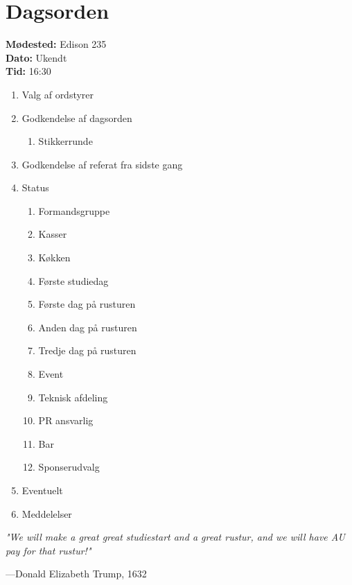 

\newcommand{\meeting}{Stormøde 1}
\newcommand{\dato}{Ukendt}
\newcommand{\tid}{16:30}
\newcommand{\location}{Edison 235}



\section*{Dagsorden}%
\textbf{Mødested:} \location{}\\
\textbf{Dato:} \dato{}\\
\textbf{Tid:} \tid{}

\begin{enumerate}
  \item Valg af ordstyrer
  \item Godkendelse af dagsorden
  \begin{enumerate}
    \item Stikkerrunde
  \end{enumerate}
  \item Godkendelse af referat fra sidste gang
  \item Status
  \begin{enumerate}
    \item Formandsgruppe
    \item Kasser
    \item Køkken
    \item Første studiedag
    \item Første dag på rusturen
    \item Anden dag på rusturen
    \item Tredje dag på rusturen
    \item Event
    \item Teknisk afdeling
    \item PR ansvarlig
    \item Bar
    \item Sponserudvalg
  \end{enumerate}
  \item Eventuelt
  \item Meddelelser
\end{enumerate}



\vspace{2em}
\begin{minipage}{0.55\textwidth}
  \color{gray}\footnotesize\textit{"We will make a great great studiestart and a great rustur, and we will have AU pay for that rustur!"}

  \raggedleft\----Donald Elizabeth Trump, 1632
\end{minipage}



